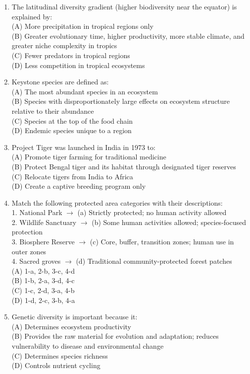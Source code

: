 \documentclass{article}
\begin{document}
\begin{enumerate}[label=Q\arabic*.]
\item The latitudinal diversity gradient (higher biodiversity near the equator) is explained by:
\\(A) More precipitation in tropical regions only
\\(B) Greater evolutionary time, higher productivity, more stable climate, and greater niche complexity in tropics
\\(C) Fewer predators in tropical regions
\\(D) Less competition in tropical ecosystems

\item Keystone species are defined as:
\\(A) The most abundant species in an ecosystem
\\(B) Species with disproportionately large effects on ecosystem structure relative to their abundance
\\(C) Species at the top of the food chain
\\(D) Endemic species unique to a region

\item Project Tiger was launched in India in 1973 to:
\\(A) Promote tiger farming for traditional medicine
\\(B) Protect Bengal tiger and its habitat through designated tiger reserves
\\(C) Relocate tigers from India to Africa
\\(D) Create a captive breeding program only

\item Match the following protected area categories with their descriptions:\\
1. National Park $\rightarrow$ (a) Strictly protected; no human activity allowed\\
2. Wildlife Sanctuary $\rightarrow$ (b) Some human activities allowed; species-focused protection\\
3. Biosphere Reserve $\rightarrow$ (c) Core, buffer, transition zones; human use in outer zones\\
4. Sacred groves $\rightarrow$ (d) Traditional community-protected forest patches
\\(A) 1-a, 2-b, 3-c, 4-d
\\(B) 1-b, 2-a, 3-d, 4-c
\\(C) 1-c, 2-d, 3-a, 4-b
\\(D) 1-d, 2-c, 3-b, 4-a

\item Genetic diversity is important because it:
\\(A) Determines ecosystem productivity
\\(B) Provides the raw material for evolution and adaptation; reduces vulnerability to disease and environmental change
\\(C) Determines species richness
\\(D) Controls nutrient cycling

\end{enumerate}
\end{document}
